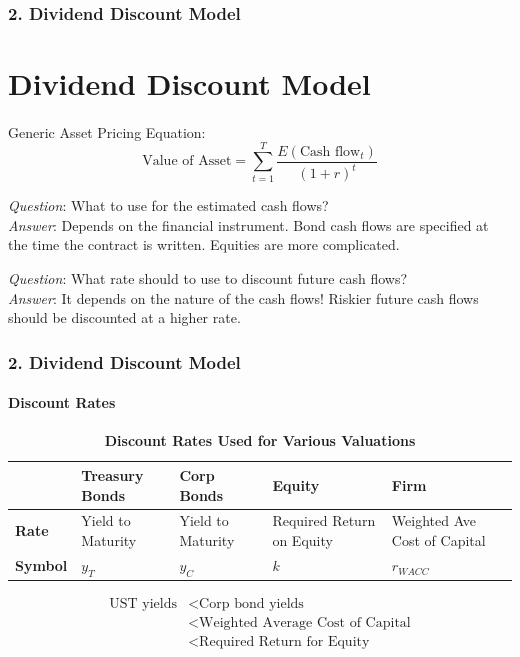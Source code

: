 \documentclass{beamer}
\begin{document}
\begin{frame}[t]
    \frametitle{2. Dividend Discount Model}
    \section{Dividend Discount Model}
    \framesubtitle{}

    Generic Asset Pricing Equation:
    $$
    \text{Value of Asset} = \sum_{t=1}^{T}\frac{E(\text{Cash flow}_t)}{(1+r)^t}
    $$

    \textit{Question}: What to use for the estimated cash flows?\\
    \textit{Answer}: Depends on the financial instrument.   Bond cash flows are specified at the time the contract is written.   Equities 
    are more complicated.

    \vspace{1em}

    \textit{Question}: What rate should to use to discount future cash flows?\\
    \textit{Answer}: It depends on the nature of the cash flows! Riskier future cash flows should be discounted at a higher rate.

\end{frame}


\begin{frame}[t]
    \frametitle{2. Dividend Discount Model}
    \framesubtitle{Discount Rates}

    \begin{table}
        \centering
        \caption{\textbf{Discount Rates Used for Various Valuations}}
        \begin{tabular}{|p{1.5cm}|m{1.5cm}|m{1.5cm}|m{1.5cm}|m{1.5cm}|}
        \hline
        & \textbf{Treasury Bonds} & \textbf{Corp Bonds} & \textbf{Equity} & \textbf{Firm} \\
        \hline
        \textbf{Rate} & Yield to Maturity & Yield to Maturity & Required Return on Equity & Weighted Ave Cost of Capital \\
        \hline
        \textbf{Symbol} & $y_T$ & $y_C$ & $k$ & $r_{WACC}$ \\
        \hline
        \end{tabular}
    \end{table}

    \begin{align*}
    \text{UST yields} &< \text{Corp bond yields} \\
    &< \text{Weighted Average Cost of Capital}\\
    &< \text{Required Return for Equity} 
    \end{align*}


\end{frame}
\end{document}
